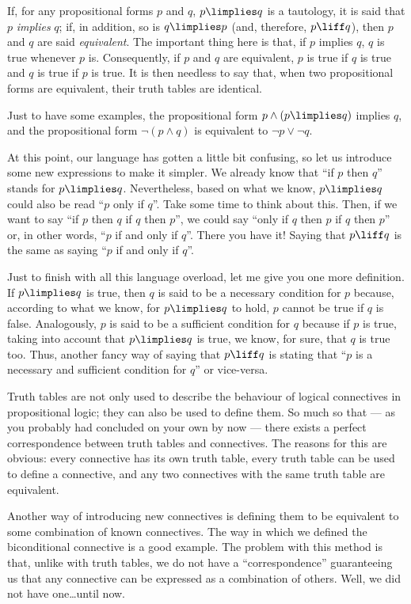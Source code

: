 \begin{para}
If, for any propositional forms $p$ and $q$, $p\limplies q$ is a tautology, it is said that $p$ \emph{implies} $q$; if, in addition, so is $q\limplies p$ (and, therefore, $p\liff q$), then $p$ and $q$ are said \emph{equivalent}.
The important thing here is that, if $p$ implies $q$, $q$ is true whenever $p$ is. Consequently, if $p$ and $q$ are equivalent, $p$ is true if $q$ is true and $q$ is true if $p$ is true.
It is then needless to say that, when two propositional forms are equivalent, their truth tables are identical.

Just to have some examples, the propositional form $p\land (p\limplies q)$ implies $q$, and the propositional form $\lnot(p\land q)$ is equivalent to $\lnot p \lor \lnot q$.
\end{para}

\begin{para}
At this point, our language has gotten a little bit confusing, so let us introduce some new expressions to make it simpler. We already know that ``if $p$ then $q$'' stands for $p\limplies q$. Nevertheless, based on what we know, $p\limplies q$ could also be read ``$p$ only if $q$''. Take some time to think about this.
Then, if we want to say ``if $p$ then $q$  if $q$ then $p$'', we could say ``only if $q$ then $p$  if $q$ then $p$'' or, in other words, ``$p$ if and only if $q$''. There you have it! Saying that $p\liff q$ is the same as saying ``$p$ if and only if $q$''.

Just to finish with all this language overload, let me give you one more definition. If $p\limplies q$ is true, then $q$ is said to be a necessary condition for $p$ because, according to what we know, for $p\limplies q$ to hold, $p$ cannot be true if $q$ is false. Analogously, $p$ is said to be a sufficient condition for $q$ because if $p$ is true, taking into account that $p\limplies q$ is true, we know, for sure, that $q$ is true too.
Thus, another fancy way of saying that $p\liff q$ is stating that ``$p$ is a necessary and sufficient condition for $q$'' or vice-versa. 
\end{para}

\begin{para}
Truth tables are not only used to describe the behaviour of logical connectives in propositional logic; they can also be used to define them. So much so that --- as you probably had concluded on your own by now --- there exists a perfect correspondence between truth tables and connectives.
The reasons for this are obvious: every connective has its own truth table, every truth table can be used to define a connective, and any two connectives with the same truth table are equivalent.

Another way of introducing new connectives is defining them to be equivalent to some combination of known connectives.
The way in which we defined the biconditional connective is a good example.
The problem with this method is that, unlike with truth tables, we do not have a ``correspondence'' guaranteeing us that any connective can be expressed as a combination of others. Well, we did not have one\ldots until now.
\end{para}

